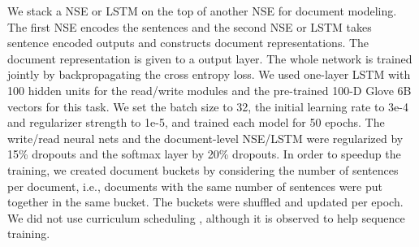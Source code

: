 \documentclass{article}
\begin{document}
We stack a NSE or LSTM on the top of another NSE for document modeling. The first NSE encodes the sentences and the second NSE or LSTM takes sentence encoded outputs and constructs document representations. The document representation is given to a output  layer. The whole network is trained jointly by backpropagating the cross entropy loss. We used one-layer LSTM with 100 hidden units for the read/write modules and the pre-trained 100-D Glove 6B vectors for this task. We set the batch size to 32, the initial learning rate to 3e-4 and  regularizer strength to 1e-5, and trained each model for 50 epochs. The write/read neural nets and the document-level NSE/LSTM were regularized by 15\% dropouts and the softmax layer by 20\% dropouts. In order to speedup the training, we created document buckets by considering the number of sentences per document, i.e., documents with the same number of sentences were put together in the same bucket. The buckets were shuffled and updated per epoch. We did not use curriculum scheduling \cite{bengio2009curriculum}, although it is observed to help sequence training.
\end{document}
